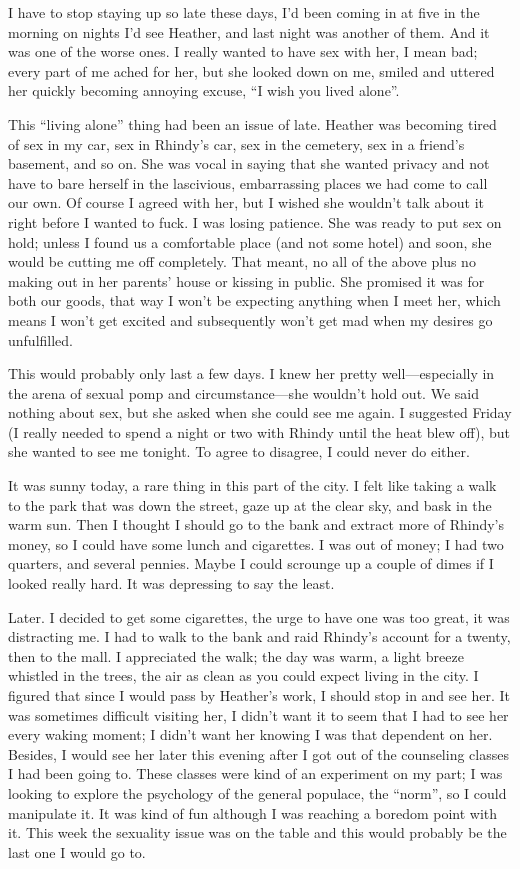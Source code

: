 I have to stop staying up so late these days, I'd been coming in at five
in the morning on nights I'd see Heather, and last night was another of
them. And it was one of the worse ones. I really wanted to have sex with
her, I mean bad; every part of me ached for her, but she looked down on
me, smiled and uttered her quickly becoming annoying excuse, ``I wish
you lived alone''.

This ``living alone'' thing had been an issue of late. Heather was
becoming tired of sex in my car, sex in Rhindy's car, sex in the
cemetery, sex in a friend's basement, and so on. She was vocal in saying
that she wanted privacy and not have to bare herself in the lascivious,
embarrassing places we had come to call our own. Of course I agreed with
her, but I wished she wouldn't talk about it right before I wanted to
fuck. I was losing patience. She was ready to put sex on hold; unless I
found us a comfortable place (and not some hotel) and soon, she would be
cutting me off completely. That meant, no all of the above plus no
making out in her parents' house or kissing in public. She promised it
was for both our goods, that way I won't be expecting anything when I
meet her, which means I won't get excited and subsequently won't get mad
when my desires go unfulfilled.

This would probably only last a few days. I knew her pretty
well---especially in the arena of sexual pomp and circumstance---she
wouldn't hold out. We said nothing about sex, but she asked when she
could see me again. I suggested Friday (I really needed to spend a night
or two with Rhindy until the heat blew off), but she wanted to see me
tonight. To agree to disagree, I could never do either.

It was sunny today, a rare thing in this part of the city. I felt like
taking a walk to the park that was down the street, gaze up at the clear
sky, and bask in the warm sun. Then I thought I should go to the bank
and extract more of Rhindy's money, so I could have some lunch and
cigarettes. I was out of money; I had two quarters, and several pennies.
Maybe I could scrounge up a couple of dimes if I looked really hard. It
was depressing to say the least.

Later. I decided to get some cigarettes, the urge to have one was too
great, it was distracting me. I had to walk to the bank and raid
Rhindy's account for a twenty, then to the mall. I appreciated the walk;
the day was warm, a light breeze whistled in the trees, the air as clean
as you could expect living in the city. I figured that since I would
pass by Heather's work, I should stop in and see her. It was sometimes
difficult visiting her, I didn't want it to seem that I had to see her
every waking moment; I didn't want her knowing I was that dependent on
her. Besides, I would see her later this evening after I got out of the
counseling classes I had been going to. These classes were kind of an
experiment on my part; I was looking to explore the psychology of the
general populace, the ``norm'', so I could manipulate it. It was kind of
fun although I was reaching a boredom point with it. This week the
sexuality issue was on the table and this would probably be the last one
I would go to.

